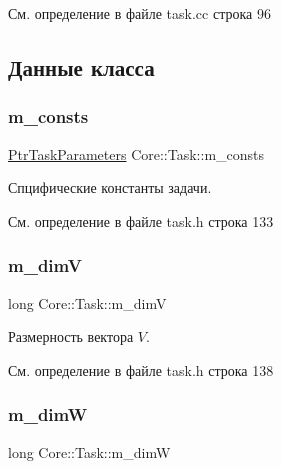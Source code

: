 См. определение в файле task.\+cc строка 96



\subsection{Данные класса}
\hypertarget{class_core_1_1_task_a1482a9a5e2a70c22fa58d2695a680890}{}\label{class_core_1_1_task_a1482a9a5e2a70c22fa58d2695a680890} 
\subsubsection{\texorpdfstring{m\+\_\+consts}{m\_consts}}
{\footnotesize\ttfamily \hyperlink{namespace_core_a3e0e555656bf795146ebb0882e28da2f}{Ptr\+Task\+Parameters} Core\+::\+Task\+::m\+\_\+consts\hspace{0.3cm}{\ttfamily [protected]}}

Спцифические константы задачи. 

См. определение в файле task.\+h строка 133

\hypertarget{class_core_1_1_task_a2b117926018d3463708aa6e8657766b3}{}\label{class_core_1_1_task_a2b117926018d3463708aa6e8657766b3} 
\subsubsection{\texorpdfstring{m\+\_\+dimV}{m\_dimV}}
{\footnotesize\ttfamily long Core\+::\+Task\+::m\+\_\+dimV\hspace{0.3cm}{\ttfamily [protected]}}

Размерность вектора $V$. 

См. определение в файле task.\+h строка 138

\hypertarget{class_core_1_1_task_a873b2d4f0d94068f327a18483a4c5318}{}\label{class_core_1_1_task_a873b2d4f0d94068f327a18483a4c5318} 
\subsubsection{\texorpdfstring{m\+\_\+dimW}{m\_dimW}}
{\footnotesize\ttfamily long Core\+::\+Task\+::m\+\_\+dimW\hspace{0.3cm}{\ttfamily [protected]}}

